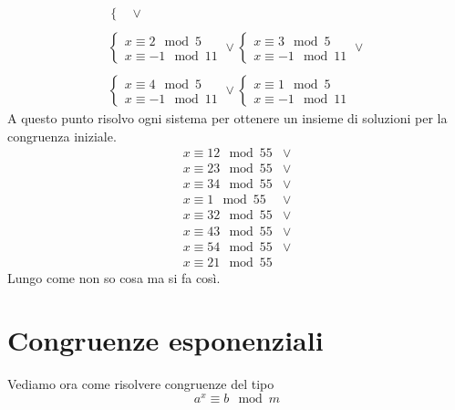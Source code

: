 \begin{example}
\begin{equation*}
\begin{array}{c}
\begin{cases}
			\end{cases} \vee  \\
			\\
			\begin{cases}
				x \equiv 2 \mod{5} \\
				x \equiv -1 \mod{11}
			\end{cases} \vee
			\begin{cases}
				x \equiv 3 \mod{5} \\
				x \equiv -1 \mod{11}
			\end{cases} \vee \\
			\\
			\begin{cases}
				x \equiv 4 \mod{5} \\
				x \equiv -1 \mod{11}
			\end{cases} \vee
			\begin{cases}
				x \equiv 1 \mod{5} \\
				x \equiv -1 \mod{11}
			\end{cases}
		\end{array}
	\end{equation*}
	A questo punto risolvo ogni sistema per ottenere un insieme di soluzioni per la congruenza
	iniziale.
	\begin{equation*}
		\begin{array}{cc}
			x \equiv 12 \mod{55} & \vee \\
			x \equiv 23 \mod{55} & \vee \\
			x \equiv 34 \mod{55} & \vee \\
			x \equiv 1 \mod{55}  & \vee \\
			x \equiv 32 \mod{55} & \vee \\
			x \equiv 43 \mod{55} & \vee \\
			x \equiv 54 \mod{55} & \vee \\
			x \equiv 21 \mod{55}
		\end{array}
	\end{equation*}
	Lungo come non so cosa ma si fa cos\`i.
\end{example}

\section{Congruenze esponenziali}
Vediamo ora come risolvere congruenze del tipo
\begin{equation*}
	a^x \equiv b \mod{m}
\end{equation*}

